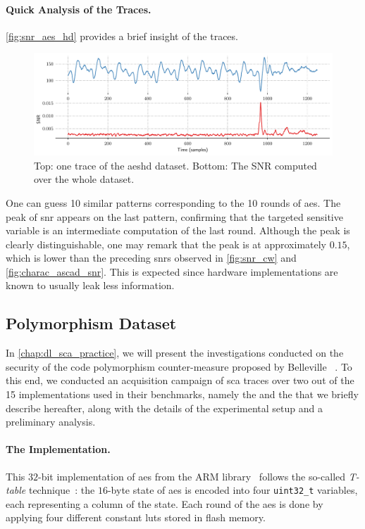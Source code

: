 \paragraph{Quick Analysis of the Traces.}
\autoref{fig:snr_aes_hd} provides a brief insight of the traces.
\begin{figure}
    \centering
    \includegraphics[width=\textwidth]{AES-HD/snr}
    \caption{Top: one trace of the \gls{aeshd} dataset.
    Bottom: The SNR computed over the whole dataset.}
    \label{fig:snr_aes_hd}
\end{figure}
One can guess 10 similar patterns corresponding to the 10 rounds of \gls{aes}.
The peak of \gls{snr} appears on the last pattern, confirming that the targeted sensitive variable is an intermediate computation of the last round.
Although the peak is clearly distinguishable, one may remark that the peak is at approximately \(0.15\), which is lower than the preceding \glspl{snr} observed in \autoref{fig:snr_cw} and \autoref{fig:charac_ascad_snr}.
This is expected since hardware implementations are known to usually leak less information.


\subsection{Polymorphism Dataset}
\label{sec:claps_ds}
In \autoref{chap:dl_sca_practice}, we will present the investigations conducted on the security of the code polymorphism counter-measure proposed by Belleville \etal{}~\cite{belleville_automated_2019}.
To this end, we conducted an acquisition campaign of \gls{sca} traces over two out of the 15 implementations used in their benchmarks, namely the \aeshuitbit{} and the \mbedTLS{} that we briefly describe hereafter, along with the details of the experimental setup and a preliminary analysis.

\paragraph{The \mbedTLS{} Implementation.}
This \(32\)-bit implementation of \gls{aes} from the \textsf{ARM} library~\cite{mbed_tls_code} follows the so-called \emph{T-table} technique~\cite{AES_rijndael_2002}: the \(16\)-byte state of \gls{aes} is encoded into four \verb+uint32_t+ variables, each representing a column of the state.
Each round of the \gls{aes} is done by applying four different constant \glspl{lut} stored in flash memory.


